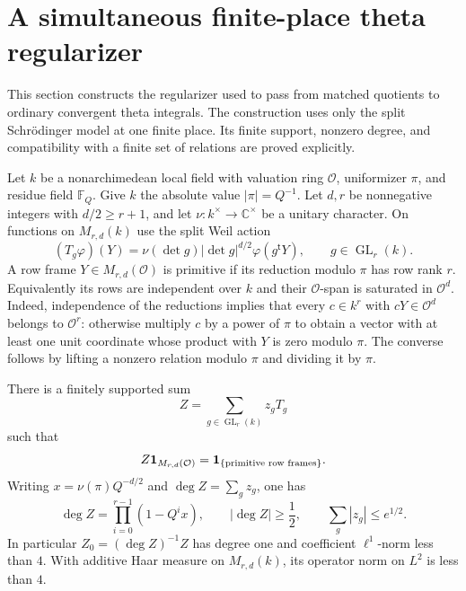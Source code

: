 \section{A simultaneous finite-place theta regularizer}
\label{sec:sr-finite-regularizer}

This section constructs the regularizer used to pass from matched
quotients to ordinary convergent theta integrals.  The construction uses
only the split Schr\"odinger model at one finite place.  Its finite support,
nonzero degree, and compatibility with a finite set of relations are
proved explicitly.

Let \(k\) be a nonarchimedean local field with valuation ring \(\mathcal O\),
uniformizer \(\pi\), and residue field \(\mathbb F_Q\).  Give \(k\) the
absolute value \(|\pi|=Q^{-1}\).  Let \(d,r\) be nonnegative integers with
\(d/2\ge r+1\), and let \(\nu:k^\times\to\mathbb C^\times\) be a unitary character.
On functions on \(M_{r,d}(k)\) use the split Weil action
\begin{equation}\label{eq:sr-regularizer-action}
 (T_g\varphi)(Y)=\nu(\det g)|\det g|^{d/2}\varphi(g^{\mathsf t}Y),
 \qquad g\in\operatorname{GL}_r(k).
\end{equation}
A row frame \(Y\in M_{r,d}(\mathcal O)\) is primitive if its reduction
modulo \(\pi\) has row rank \(r\).  Equivalently its rows are independent
over \(k\) and their \(\mathcal O\)-span is saturated in
\(\mathcal O^d\).  Indeed, independence of the reductions implies that
every \(c\in k^r\) with \(cY\in\mathcal O^d\) belongs to \(\mathcal O^r\):
otherwise multiply \(c\) by a power of \(\pi\) to obtain a vector with at
least one unit coordinate whose product with \(Y\) is zero modulo \(\pi\).
The converse follows by lifting a nonzero relation modulo \(\pi\) and
dividing it by \(\pi\).

\begin{srproposition}
\label{prop:sr-primitive-regularizer}
There is a finitely supported sum
\[
 Z=\sum_{g\in\operatorname{GL}_r(k)}z_g T_g
\]
such that
\[
 Z{\bf1}_{M_{r,d}(\mathcal O)}
   ={\bf1}_{\{\text{primitive row frames}\}}.
\]
Writing \(x=\nu(\pi)Q^{-d/2}\) and \(\deg Z=\sum_gz_g\), one has
\begin{equation}\label{eq:sr-regularizer-degree}
 \deg Z=\prod_{i=0}^{r-1}(1-Q^i x),\qquad
 |\deg Z|\ge\frac12,\qquad
 \sum_g|z_g|\le e^{1/2}.
\end{equation}
In particular \(Z_0=(\deg Z)^{-1}Z\) has degree one and coefficient
\(\ell^1\)-norm less than \(4\).  With additive Haar measure on
\(M_{r,d}(k)\), its operator norm on \(L^2\) is less than \(4\).
\end{srproposition}

